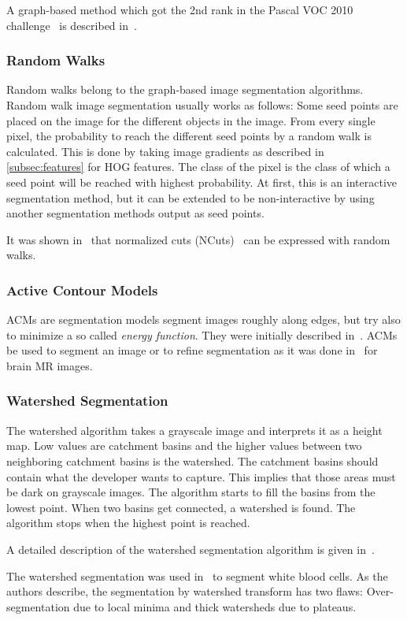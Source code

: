 A graph-based method which got the 2nd rank in the Pascal VOC 2010
challenge~\cite{everingham2010pascal} is described
in~\cite{carreira2010constrained}.


\subsubsection{Random Walks}

Random walks belong to the graph-based image segmentation algorithms. Random
walk image segmentation usually works as follows: Some seed points are placed
on the image for the different objects in the image. From every single pixel,
the probability to reach the different seed points by a random walk is
calculated. This is done by taking image gradients as described in
\cref{subsec:features} for \gls{HOG} features. The class of the pixel is the
class of which a seed point will be reached with highest probability. At first,
this is an interactive segmentation method, but it can be extended to be
non-interactive by using another segmentation methods output as seed points.

It was shown in~\cite{meilpa2001learning} that normalized cuts
(NCuts)~\cite{shi2000normalized} can be expressed with random walks.


\subsubsection{Active Contour Models}

\Glspl{ACM} are segmentation models segment images roughly along edges, but
try also to minimize a so called \textit{energy function}. They were initially
described in~\cite{kass1988snakes}. \Glspl{ACM} be used to segment an image or
to refine segmentation as it was done in~\cite{atkins1998fully} for brain
\gls{MR} images.


\subsubsection{Watershed Segmentation}\label{subsec:watershed}
The watershed algorithm takes a grayscale image and interprets it as a height
map. Low values are catchment basins and the higher values between two
neighboring catchment basins is the watershed. The catchment basins should
contain what the developer wants to capture. This implies that those areas
must be dark on grayscale images. The algorithm starts to fill the basins from
the lowest point. When two basins get connected, a watershed is found. The
algorithm stops when the highest point is reached.

A detailed description of the watershed segmentation algorithm is given
in~\cite{roerdink2000watershed}.

The watershed segmentation was used in~\cite{1260033} to segment white blood
cells. As the authors describe, the segmentation by watershed transform has
two flaws: Over-segmentation due to local minima and thick watersheds due to
plateaus.